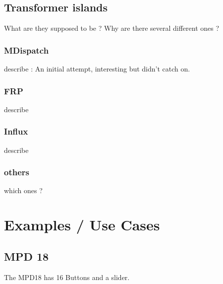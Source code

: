 \documentclass{article}
\begin{document}
\subsection{Transformer islands} 

What are they supposed to be ? Why are there several different ones ?	
	
\subsubsection{MDispatch}	

describe : An initial attempt, interesting but didn't catch on.
		
\subsubsection{FRP}

describe~\cite{-uni}



\subsubsection{Influx}

describe

\subsubsection{others}

which ones ?

\section{Examples / Use Cases}
\label{sec:examples_use_cases}


\subsection{MPD 18}
\label{sub:mpd_18}

The MPD18 has 16 Buttons and a slider.
\end{document}
